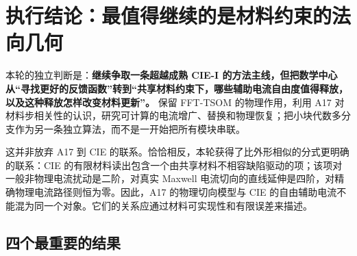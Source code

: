 \documentclass[10pt,a4paper]{article}
\begin{document}
\hypersetup{pageanchor=false}

\hypersetup{pageanchor=true}
\setcounter{page}{1}
\tableofcontents
\clearpage
\hypertarget{ux6267ux884cux7ed3ux8bbaux6700ux503cux5f97ux7ee7ux7eedux7684ux662fux6750ux6599ux7ea6ux675fux7684ux6cd5ux5411ux51e0ux4f55}{%
\section{执行结论：最值得继续的是材料约束的法向几何}\label{ux6267ux884cux7ed3ux8bbaux6700ux503cux5f97ux7ee7ux7eedux7684ux662fux6750ux6599ux7ea6ux675fux7684ux6cd5ux5411ux51e0ux4f55}}

本轮的独立判断是：\textbf{继续争取一条超越成熟 CIE-I
的方法主线，但把数学中心从``寻找更好的反馈函数''转到``共享材料约束下，哪些辅助电流自由度值得释放，以及这种释放怎样改变材料更新''。}
保留 FFT-TSOM 的物理作用，利用 A17
对材料步相关性的认识，研究可计算的电流增广、替换和物理恢复；把小块代数多分支作为另一条独立算法，而不是一开始把所有模块串联。

这并非放弃 A17 到 CIE
的联系。恰恰相反，本轮获得了比外形相似的分式更明确的联系：CIE
的有限材料读出包含一个由共享材料不相容缺陷驱动的项；该项对一般非物理电流扰动是二阶，对真实
Maxwell 电流切向的直线延伸是四阶，对精确物理电流路径则恒为零。因此，A17
的物理切向模型与 CIE
的自由辅助电流不能混为同一个对象。它们的关系应通过材料可实现性和有限误差来描述。

\hypertarget{ux56dbux4e2aux6700ux91cdux8981ux7684ux7ed3ux679c}{%
\subsection{四个最重要的结果}\label{ux56dbux4e2aux6700ux91cdux8981ux7684ux7ed3ux679c}}
\end{document}

